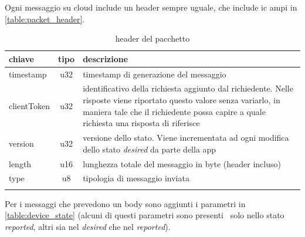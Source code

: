 \documentclass[12pt,a4paper,twoside,titlepage]{book}
\begin{document}
Ogni messaggio su cloud include un header sempre uguale, che include ic ampi in \autoref{table:packet_header}.

\begin{center}
\begin{longtable}{| p{5cm} | c | p{8cm} |}
    \hline
    \textbf{chiave} & \textbf{tipo} & \textbf{descrizione} \\ \hline
    timestamp & u32 & timestamp di generazione del messaggio \\ \hline
    clientToken & u32 & identificativo della richiesta aggiunto dal richiedente. Nelle risposte 
        viene riportato questo valore senza variarlo, in maniera tale che il richiedente possa 
        capire a quale richiesta una risposta di riferisce \\ \hline
    version & u32 & versione dello stato. Viene incrementata ad ogni modifica dello stato \textit{desired} 
        da parte della app \\\hline
    length & u16 & lunghezza totale del messaggio in byte (header incluso) \\ \hline
    type & u8 & tipologia di messaggio inviata \\ \hline
    \caption{header del pacchetto}
    \label{table:packet_header}
\end{longtable}
\end{center}

Per i messaggi che prevedono un body sono aggiunti i parametri in \autoref{table:device_state} (alcuni di questi parametri sono presenti \
solo nello stato \textit{reported}, altri sia nel \textit{desired} che nel \textit{reported}).
\end{document}
